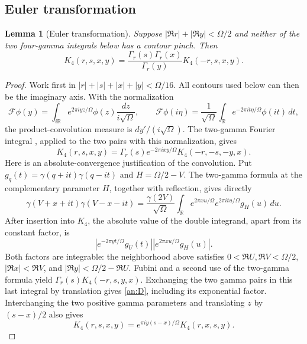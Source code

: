 \documentclass[11pt]{article}
\numberwithin{equation}{section}
\newtheorem{lemma}[theorem]{Lemma}
\theoremstyle{definition}
\theoremstyle{remark}
\newcommand{\R}{\mathbb R}
\begin{document}
\subsection{Euler transformation}

\begin{lemma}[Euler transformation]\label{an:euler}
Suppose $|\Re r|+|\Re y|<\Omega/2$ and neither of the two
four-gamma integrals below has a contour pinch.  Then
\begin{equation}
 K_4(r,s,x,y)=\frac{\Gamma_r(s)\Gamma_r(x)}{\Gamma_r(y)}K_4(-r,s,x,y).
 \label{an:euler-centered}
\end{equation}
\end{lemma}

\begin{proof}
Work first in $|r|+|s|+|x|+|y|<\Omega/16$.  All contours used below
can then be the imaginary axis.  With the normalization
\[
 \mathcal F\phi(y)=\int_{i\R}e^{2\pi iyz/\Omega}\phi(z)
                                     \frac{dz}{i\sqrt\Omega},
 \qquad
 \mathcal F\phi(i\eta)=\frac1{\sqrt\Omega}
       \int_{\R}e^{-2\pi it\eta/\Omega}\phi(it)\,dt,
\]
the product-convolution measure is $dy'/(i\sqrt\Omega)$.
The two-gamma Fourier integral \cite[Eq.~(2.17)]{BSS}, applied to
the two pairs with this normalization, gives
\begin{equation}
 K_4(r,s,x,y)=\Gamma_r(s)e^{-2\pi ixy/\Omega}K_4(-r,-s,-y,x).
 \label{an:D}
\end{equation}
Here is an absolute-convergence justification of the convolution.
Put $g_q(t)=\gamma(q+it)\gamma(q-it)$ and $H=\Omega/2-V$.
The two-gamma formula at the complementary parameter $H$, together
with reflection, gives directly
\[
 \gamma(V+x+it)\gamma(V-x-it)
 =\frac{\gamma(2V)}{\sqrt\Omega}
   \int_{\R}e^{2\pi xu/\Omega}e^{2\pi itu/\Omega}g_H(u)\,du.
\]
After insertion into $K_4$, the absolute value of the double integrand,
apart from its constant factor, is
\[
 \left|e^{-2\pi yt/\Omega}g_U(t)\right|
 \left|e^{2\pi xu/\Omega}g_H(u)\right|.
\]
Both factors are integrable: the neighborhood above satisfies
$0<\Re U,\Re V<\Omega/2$, $|\Re x|<\Re V$, and
$|\Re y|<\Omega/2-\Re U$.  Fubini and a second use of the two-gamma
formula yield $\Gamma_r(s)K_4(-r,s,y,x)$.
Exchanging the two gamma pairs in this last integral by translation
gives \eqref{an:D}, including its exponential factor.
Interchanging the two positive gamma parameters and translating $z$
by $(s-x)/2$ also gives
\begin{equation}
 K_4(r,s,x,y)=e^{\pi iy(s-x)/\Omega}K_4(r,x,s,y).
 \label{an:P}

\end{equation}
\end{proof}
\end{document}
